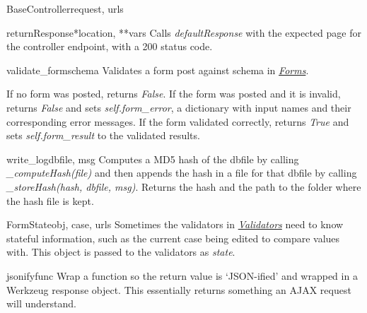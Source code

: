 \documentclass[letterpaper,10pt,english]{manual}
\begin{document}
\begin{classdesc}{BaseController}{request, urls}
\hypertarget{webscavator.controllers.baseController.BaseController.returnResponse}{}\begin{methoddesc}{returnResponse}{*location, **vars}
Calls \emph{defaultResponse} with the expected page for the controller endpoint, with
a 200 status code.
\end{methoddesc}

\hypertarget{webscavator.controllers.baseController.BaseController.validate_form}{}\begin{methoddesc}{validate\_form}{schema}
Validates a form post against schema in \hyperlink{--doc-forms}{\emph{Forms}}.

If no form was posted, returns \emph{False}. 
If the form was posted and it is invalid, returns \emph{False} 
and sets \emph{self.form\_error}, a dictionary with input names and 
their corresponding error messages. 
If the form validated correctly, returns \emph{True} and sets \emph{self.form\_result} to the
validated results.
\end{methoddesc}

\hypertarget{webscavator.controllers.baseController.BaseController.write_log}{}\begin{methoddesc}{write\_log}{dbfile, msg}
Computes a MD5 hash of the dbfile by calling \emph{\_computeHash(file)} and then appends 
the hash in a file for that dbfile by calling \emph{\_storeHash(hash, dbfile, msg)}.
Returns the hash and the path to the folder where the hash file is kept.
\end{methoddesc}
\end{classdesc}

\hypertarget{webscavator.controllers.baseController.FormState}{}\begin{classdesc}{FormState}{obj, case, urls}
Sometimes the validators in \hyperlink{--doc-validators}{\emph{Validators}} need to know stateful information, such as
the current case being edited to compare values with. 
This object is passed to the validators as \emph{state}.
\end{classdesc}

\hypertarget{webscavator.controllers.baseController.jsonify}{}\begin{funcdesc}{jsonify}{func}
Wrap a function so the return value is `JSON-ified' and wrapped in a Werkzeug response object. 
This essentially returns something an AJAX request will understand.
\end{funcdesc}
\end{document}
